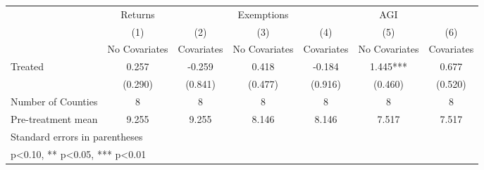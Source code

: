 {
\def\sym#1{\ifmmode^{#1}\else\(^{#1}\)\fi}
\begin{tabular}{l*{6}{c}}
\hline\hline
            &     Returns   &               &  Exemptions   &               &         AGI   &               \\
            &\multicolumn{1}{c}{(1)}&\multicolumn{1}{c}{(2)}&\multicolumn{1}{c}{(3)}&\multicolumn{1}{c}{(4)}&\multicolumn{1}{c}{(5)}&\multicolumn{1}{c}{(6)}\\
            &\multicolumn{1}{c}{No Covariates}&\multicolumn{1}{c}{Covariates}&\multicolumn{1}{c}{No Covariates}&\multicolumn{1}{c}{Covariates}&\multicolumn{1}{c}{No Covariates}&\multicolumn{1}{c}{Covariates}\\
\hline
Treated     &       0.257   &      -0.259   &       0.418   &      -0.184   &       1.445***&       0.677   \\
            &     (0.290)   &     (0.841)   &     (0.477)   &     (0.916)   &     (0.460)   &     (0.520)   \\
\hline
Number of Counties&           8   &           8   &           8   &           8   &           8   &           8   \\
Pre-treatment mean&       9.255   &       9.255   &       8.146   &       8.146   &       7.517   &       7.517   \\
\hline\hline
\multicolumn{7}{l}{\footnotesize Standard errors in parentheses}\\
\multicolumn{7}{l}{\footnotesize * p<0.10, ** p<0.05, *** p<0.01}\\
\end{tabular}
}
